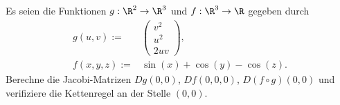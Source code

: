 \begin{prob}
Es seien die Funktionen $g:\R^2\to\R^3$ und $f:\R^3\to\R$ gegeben durch
\begin{equation*}
\begin{split}
g(u,v):=&
\begin{pmatrix}
v^2\\
u^2\\
2uv
\end{pmatrix},\\
f(x,y,z):=&\sin(x)+\cos(y)-\cos(z).
\end{split}
\end{equation*}
Berechne die Jacobi-Matrizen $Dg(0,0)$, $Df(0,0,0)$, $D(f\circ
g)(0,0)$ und verifiziere die Kettenregel an der Stelle $(0,0)$.
\end{prob}
